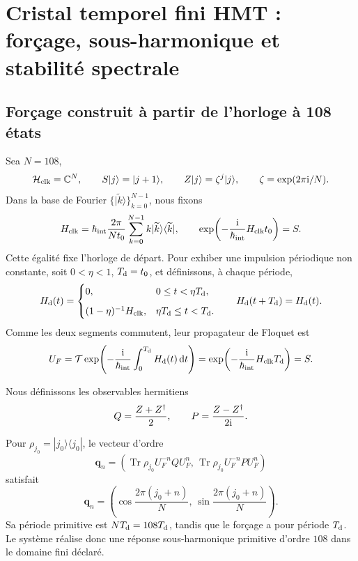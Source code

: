 \section{Cristal temporel fini HMT : forçage, sous-harmonique et stabilité spectrale}
\label{sec:hmtf2-cristal-temporal}

\subsection{Forçage construit à partir de l’horloge à 108 états}

Sea \(N=108\),
\[
 \mathcal H_{\rm clk}=\mathbb C^N,\qquad
 S|j\rangle=|j+1\rangle,\qquad
 Z|j\rangle=\zeta^j|j\rangle,\qquad
 \zeta=\exp(2\pi{\rm i}/N).
\]
Dans la base de Fourier \(\{|\widetilde k\rangle\}_{k=0}^{N-1}\), nous fixons
\[
 H_{\rm clk}
 =\hbar_{\rm int}\frac{2\pi}{Nt_0}
 \sum_{k=0}^{N-1}k|\widetilde k\rangle\langle\widetilde k|,
 \qquad
 \exp\!\left(-\frac{{\rm i}}{\hbar_{\rm int}}H_{\rm clk}t_0\right)=S.
\]
Cette égalité fixe l’horloge de départ. Pour exhiber une impulsion périodique non
constante, soit \(0<\eta<1\), \(T_{\rm d}=t_0\), et
définissons, à chaque période,
\[
 H_{\rm d}(t)=
 \begin{cases}
  0,&0\leq t<\eta T_{\rm d},\\[2mm]
  (1-\eta)^{-1}H_{\rm clk},
  &\eta T_{\rm d}\leq t<T_{\rm d}.
 \end{cases}
 \qquad H_{\rm d}(t+T_{\rm d})=H_{\rm d}(t).
\]
Comme les deux segments commutent, leur propagateur de Floquet est
\[
 U_F
 =\mathcal T\exp\!\left(
 -\frac{{\rm i}}{\hbar_{\rm int}}\int_0^{T_{\rm d}}H_{\rm d}(t)\,\mathrm dt
 \right)
 =\exp\!\left(-\frac{{\rm i}}{\hbar_{\rm int}}H_{\rm clk}T_{\rm d}\right)
 =S.
\]

Nous définissons les observables hermitiens
\[
 Q=\frac{Z+Z^\dagger}{2},
 \qquad
 P=\frac{Z-Z^\dagger}{2{\rm i}}.
\]

\begin{theorem}
\label{thm:hmtf2-subarmonia-108}
Pour \(\rho_{j_0}=|j_0\rangle\langle j_0|\), le vecteur d’ordre
\[
 \mathbf q_n
 =\left(
 \operatorname{Tr}\rho_{j_0}U_F^{-n}QU_F^n,\,
 \operatorname{Tr}\rho_{j_0}U_F^{-n}PU_F^n
 \right)
\]
satisfait
\[
 \mathbf q_n
 =\left(
 \cos\frac{2\pi(j_0+n)}N,\,
 \sin\frac{2\pi(j_0+n)}N
 \right).
\]
Sa période primitive est \(N T_{\rm d}=108T_{\rm d}\), tandis que le forçage
a pour période \(T_{\rm d}\). Le système réalise donc une réponse
sous-harmonique primitive d’ordre \(108\) dans le domaine fini déclaré.
\end{theorem}

